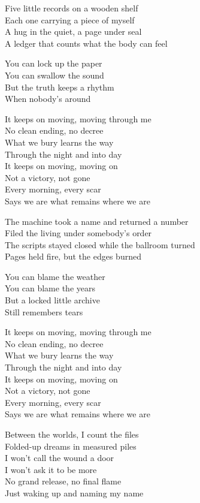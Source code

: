 \begin{lyrics}
Five little records on a wooden shelf\\
Each one carrying a piece of myself\\
A hug in the quiet, a page under seal\\
A ledger that counts what the body can feel

You can lock up the paper\\
You can swallow the sound\\
But the truth keeps a rhythm\\
When nobody's around

It keeps on moving, moving through me\\
No clean ending, no decree\\
What we bury learns the way\\
Through the night and into day\\
It keeps on moving, moving on\\
Not a victory, not gone\\
Every morning, every scar\\
Says we are what remains where we are

The machine took a name and returned a number\\
Filed the living under somebody's order\\
The scripts stayed closed while the ballroom turned\\
Pages held fire, but the edges burned

You can blame the weather\\
You can blame the years\\
But a locked little archive\\
Still remembers tears

It keeps on moving, moving through me\\
No clean ending, no decree\\
What we bury learns the way\\
Through the night and into day\\
It keeps on moving, moving on\\
Not a victory, not gone\\
Every morning, every scar\\
Says we are what remains where we are

Between the worlds, I count the files\\
Folded-up dreams in measured piles\\
I won't call the wound a door\\
I won't ask it to be more\\
No grand release, no final flame\\
Just waking up and naming my name


\end{lyrics}
